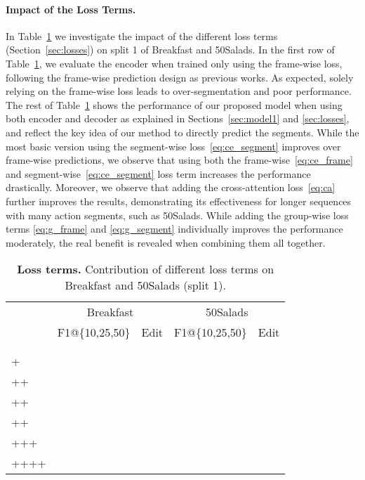 \paragraph{Impact of the Loss Terms.}
In Table~\ref{tab:ablation_losses} we investigate the impact of the different loss terms (Section~\ref{sec:losses}) on split 1 of Breakfast and 50Salads.
In the first row of Table~\ref{tab:ablation_losses}, we evaluate the encoder when trained only using the frame-wise loss, \ie following the frame-wise prediction design as previous works. As expected, solely relying on the frame-wise loss leads to over-segmentation and poor performance. The rest of Table~\ref{tab:ablation_losses} shows the performance of our proposed model when using both encoder and decoder as explained in Sections~\ref{sec:model1} and \ref{sec:losses}, and reflect the key idea of our method to directly predict the segments.
While the most basic version using the segment-wise loss~\eqref{eq:ce_segment} improves over frame-wise predictions, we observe that using both the frame-wise~\eqref{eq:ce_frame} and segment-wise~\eqref{eq:ce_segment} loss term increases the performance drastically.
Moreover, we observe that adding the cross-attention loss~\eqref{eq:ca} further improves the results, demonstrating its effectiveness for longer sequences with many action segments, such as 50Salads.
While adding the group-wise loss terms \eqref{eq:g_frame} and \eqref{eq:g_segment} individually improves the performance moderately, the real benefit is revealed when combining them all together.

\begin{table}[h]
\centering
\caption{\textbf{Loss terms.} Contribution of different loss terms on Breakfast and 50Salads (split 1).}
\resizebox{4.0 in}{!} {
\begin{tabular}{l||ccc|c||ccc|c}
\hline 
\hline 
\multicolumn{1}{c||}{} & \multicolumn{4}{c||}{Breakfast} & \multicolumn{4}{c}{50Salads}\\
\cline{2-9} 
 & \multicolumn{3}{c|}{F1@\{10,25,50\}} & Edit & \multicolumn{3}{c|}{F1@\{10,25,50\}} & Edit \\
\hline 
 &  &  &  &  &  &  &  & \\
 &  &  &  &  &  &  &  & \\
+ &  &  &  &  &  &  &  & \\
++ &  &  &  &  &  &  &  & \\
++ &  &  &  &  &  &  &  & \\
++ &  &  &  &  &  &  &  & \\
+++ &  &  &  &  &  &  &  & \\
++++ &  &  &  &  &  &  &  & \\
\hline 
\hline 
\end{tabular}
\label{tab:ablation_losses}
}
\end{table}


